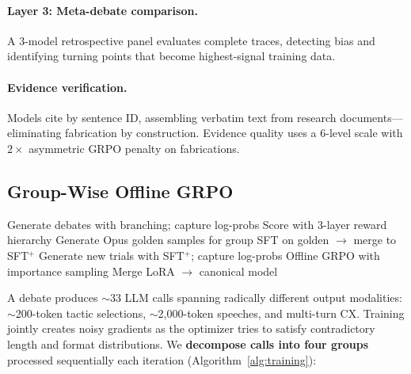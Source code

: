 \paragraph{Layer 3: Meta-debate comparison.}
A 3-model retrospective panel evaluates complete traces, detecting bias
and identifying turning points that become highest-signal training data.

\paragraph{Evidence verification.}
Models cite by sentence ID, assembling verbatim text from research
documents---eliminating fabrication by construction. Evidence quality
uses a 6-level scale with $2\times$ asymmetric GRPO penalty on
fabrications.

\subsection{Group-Wise Offline GRPO}
\label{sec:grpo}

\begin{algorithm}[t]
\caption{Group-Wise Offline GRPO for Debate}
\label{alg:training}
\begin{algorithmic}[1]
    \STATE Generate debates with branching; capture log-probs
    \STATE Score with 3-layer reward hierarchy
        \STATE Generate Opus golden samples for group
        \STATE SFT on golden $\rightarrow$ merge to SFT$^+$
        \STATE Generate new trials with SFT$^+$; capture log-probs
        \STATE Offline GRPO with importance sampling
        \STATE Merge LoRA $\rightarrow$ canonical model
    \ENDFOR
\ENDFOR
\end{algorithmic}
\end{algorithm}

A debate produces $\sim$33 LLM calls spanning radically different output
modalities: $\sim$200-token tactic selections, $\sim$2{,}000-token
speeches, and multi-turn CX. Training jointly creates noisy gradients as
the optimizer tries to satisfy contradictory length and format
distributions. We \textbf{decompose calls into four groups} processed
sequentially each iteration (Algorithm~\ref{alg:training}):

